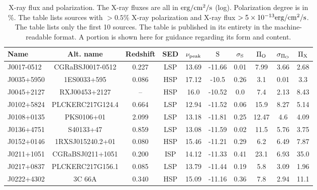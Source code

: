 \begin{table}
\caption{X-ray flux and polarization. The X-ray fluxes are all in $\rm erg/cm^2/s$ (log). Polarization degree is in \%. The table lists sources with $>0.5\%$ X-ray polarization and X-ray flux $\rm >5\times10^{-13} erg/cm^2/s$. The table lists only the first 10 sources. The table is published in its entirety in the machine-readable format. A portion is shown here for guidance regarding its form and content.}
\scriptsize
\begin{tabular}{lccccccccc}
\toprule
Name & Alt. name & Redshift & SED & $\rm \nu_{peak}$  & $\rm S$  & $\rm \sigma_S$ & $\rm \Pi_O$ & $\rm \sigma_{\Pi_O}$  & $\rm \Pi_X$ \\
\midrule
J0017-0512 & CGRaBSJ0017-0512 & 0.227 & LSP & 13.69 & -11.66 & 0.01 & 7.99 & 3.66 & 2.68  \\ 
J0035+5950 & 1ES0033+595 & 0.086 & HSP & 17.12 & -10.5 & 0.26 & 3.1 & 0.01 & 3.3  \\
J0045+2127 & RXJ00453+2127 & -- & HSP & 16.0 & -10.52 & 0.0 & 7.4 & 2.13 & 8.43  \\ 
J0102+5824 & PLCKERC217G124.4 & 0.664 & LSP & 12.94 & -11.52 & 0.06 & 15.9 & 8.27 & 5.14  \\
J0108+0135 & PKS0106+01 & 2.099 & LSP & 13.18 & -11.81 & 0.25 & 12.47 & 4.6 & 4.09  \\ 
J0136+4751 & S40133+47 & 0.859 & LSP & 13.08 & -11.59 & 0.02 & 11.5 & 5.76 & 3.75  \\ 
J0152+0146 & 1RXSJ015240.2+01 & 0.080 & HSP & 15.46 & -11.21 & 0.29 & 6.2 & 6.49 & 7.87  \\
J0211+1051 & CGRaBSJ0211+1051 & 0.200 & ISP & 14.12 & -11.33 & 0.41 & 23.1 & 6.93 & 35.0  \\
J0217+0837 & PLCKERC217G156.1 & 0.085 & LSP & 13.79 & -11.44 & 0.19 & 5.8 & 3.09 & 1.96  \\
J0222+4302 & 3C 66A & 0.340 & HSP & 15.09 & -11.16 & 0.36 & 7.8 & 2.94 & 11.1  \\
\bottomrule
\end{tabular}
\label{tab:xpol_pred}
\end{table}




